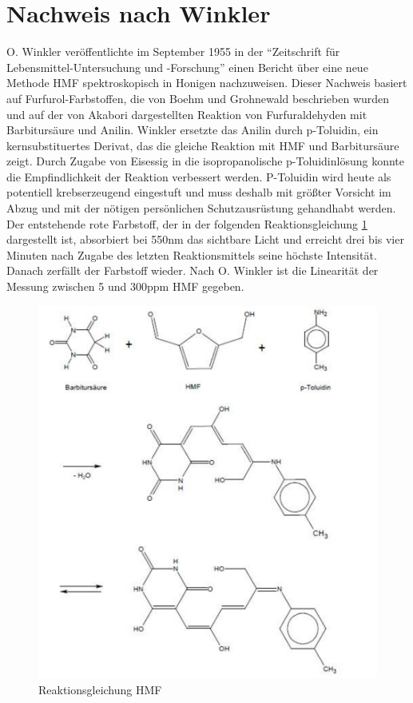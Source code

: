 \section{Nachweis nach Winkler}

O. Winkler veröffentlichte im September 1955 in der ``Zeitschrift für Lebensmittel-Untersuchung und -Forschung'' einen Bericht über eine neue Methode HMF spektroskopisch in Honigen nachzuweisen. Dieser Nachweis basiert auf Furfurol-Farbstoffen, die von Boehm und Grohnewald beschrieben wurden und auf der von Akabori dargestellten Reaktion von Furfuraldehyden mit Barbitursäure und Anilin. Winkler ersetzte das Anilin durch p-Toluidin, ein kernsubstituertes Derivat, das die gleiche Reaktion mit HMF und Barbitursäure zeigt. Durch Zugabe von Eisessig in die isopropanolische p-Toluidinlösung konnte die Empfindlichkeit der Reaktion verbessert werden. P-Toluidin wird heute als potentiell krebserzeugend eingestuft und muss deshalb mit größter Vorsicht im Abzug und mit der nötigen persönlichen Schutzausrüstung gehandhabt werden.\\
Der entstehende rote Farbstoff, der in der folgenden Reaktionsgleichung \ref{fig:Farbreaktionsgleichung2} dargestellt ist, absorbiert bei 550nm das sichtbare Licht und erreicht drei bis vier Minuten nach Zugabe des letzten Reaktionsmittels seine höchste Intensität. Danach zerfällt der Farbstoff wieder. Nach O. Winkler ist die Linearität der Messung zwischen 5 und 300ppm HMF gegeben.~\cite{Winkler}

\begin{figure}[htbp]
	\centering
		\includegraphics[width=1.00\textwidth]{../Bilder/Farbreaktionsgleichung2.pdf}
	\caption{Reaktionsgleichung HMF}
	\label{fig:Farbreaktionsgleichung2}
\end{figure}

